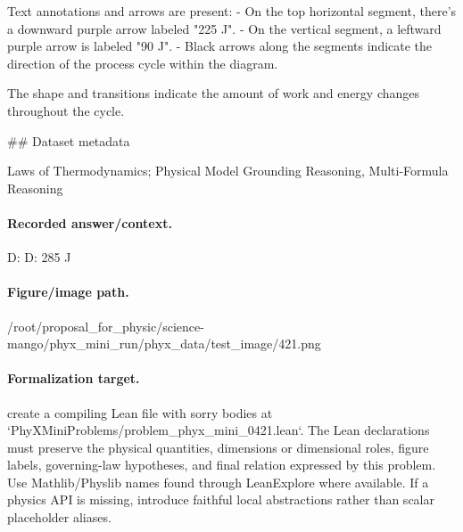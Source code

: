 Text annotations and arrows are present:
- On the top horizontal segment, there's a downward purple arrow labeled "225 J".
- On the vertical segment, a leftward purple arrow is labeled "90 J".
- Black arrows along the segments indicate the direction of the process cycle within the diagram.

The shape and transitions indicate the amount of work and energy changes throughout the cycle.

\#\# Dataset metadata

Laws of Thermodynamics; Physical Model Grounding Reasoning, Multi-Formula Reasoning

\paragraph{Recorded answer/context.}
D: D: 285 J

\paragraph{Figure/image path.}
/root/proposal\_for\_physic/science-mango/phyx\_mini\_run/phyx\_data/test\_image/421.png

\paragraph{Formalization target.}
create a compiling Lean file with sorry bodies at `PhyXMiniProblems/problem\_phyx\_mini\_0421.lean`. The Lean declarations must preserve the physical quantities, dimensions or dimensional roles, figure labels, governing-law hypotheses, and final relation expressed by this problem.
Use Mathlib/Physlib names found through LeanExplore where available. If a physics API is missing, introduce faithful local abstractions rather than scalar placeholder aliases.

